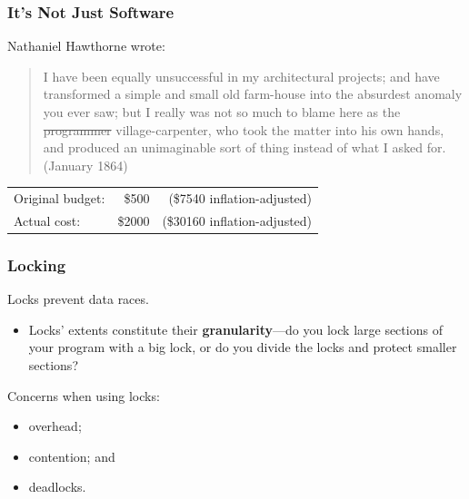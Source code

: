 \begin{frame}
  \frametitle{It's Not Just Software}


Nathaniel Hawthorne wrote:

\begin{quote}
I have been equally unsuccessful in my architectural projects; and have transformed a simple and small old farm-house into the absurdest anomaly you ever saw; but I really was not so much to blame here as the \sout{programmer} village-carpenter, who took the matter into his own hands, and produced an unimaginable sort of thing instead of what I asked for. (January 1864)
\end{quote}


\begin{tabular}{lrr}
Original budget:& \$500 &(\$7540 inflation-adjusted)\\
Actual cost: &\$2000 &(\$30160 inflation-adjusted)
\end{tabular}



\end{frame}



\begin{frame}
  \frametitle{Locking}

  
  Locks prevent data races.

  \begin{itemize}
    \item Locks' extents constitute their {\bf granularity}---do you lock large sections of your program with a big lock, or do you divide the locks and protect smaller sections?
  \end{itemize}

  Concerns when using locks:

  \begin{itemize}
    \item overhead;
    \item contention; and
    \item deadlocks.
  \end{itemize}
  
\end{frame}

